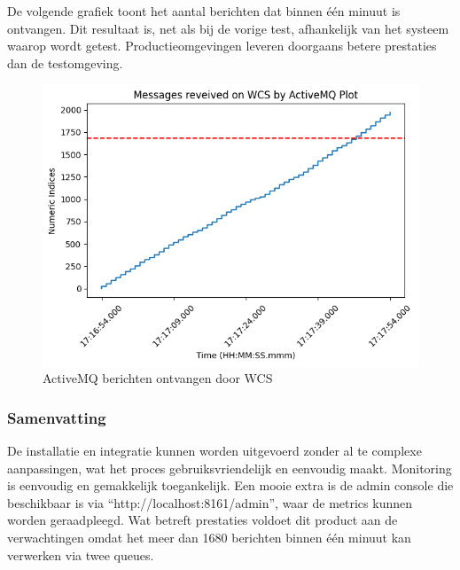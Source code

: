 De volgende grafiek toont het aantal berichten dat binnen één minuut is ontvangen. 
Dit resultaat is, net als bij de vorige test, afhankelijk van het systeem waarop wordt getest. 
Productieomgevingen leveren doorgaans betere prestaties dan de testomgeving.
\begin{figure}[h!]
  \centering
  \includegraphics[width=.95\textwidth]{img/amq_received_wcs.png}
  \caption{\label{fig:amq_received_wcs}ActiveMQ berichten ontvangen door WCS}
\end{figure}

\subsubsection{Samenvatting}
De installatie en integratie kunnen worden uitgevoerd zonder al te complexe aanpassingen, 
wat het proces gebruiksvriendelijk en eenvoudig maakt.
Monitoring is eenvoudig en gemakkelijk toegankelijk. 
Een mooie extra is de admin console die beschikbaar is via ``http://localhost:8161/admin'', waar de metrics kunnen worden geraadpleegd.
Wat betreft prestaties voldoet dit product aan de verwachtingen omdat het meer dan 1680 berichten binnen één minuut kan verwerken via twee queues.

\newpage
